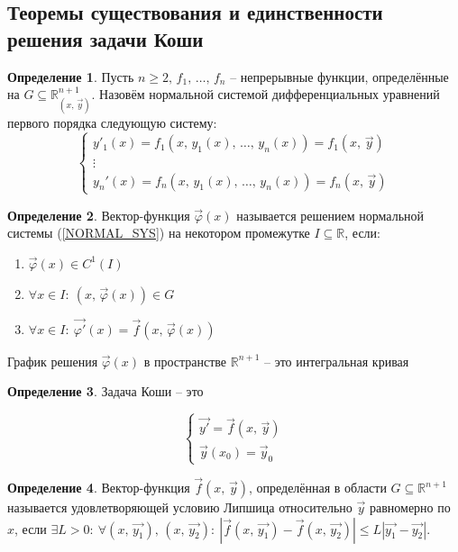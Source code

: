 \documentclass[a4paper,12pt]{article}
\renewcommand{\phi}{\ensuremath{\varphi}}
\renewcommand{\leq}{\ensuremath{\leqslant}}
\renewcommand{\geq}{\ensuremath{\geqslant}}
\theoremstyle{plain}
\theoremstyle{definition}
\newtheorem{definition}{Определение}[section]
\theoremstyle{remark}
\begin{document}
\subsection{Теоремы существования и единственности решения задачи Коши}
\begin{definition}
	Пусть $n \geq 2,\, f_1,\, \ldots,\, f_n$ -- непрерывные функции, определённые на $G \subseteq \mathbb{R}^{n + 1}_{(x,\, \vec{y})}$. Назовём нормальной системой дифференциальных уравнений первого порядка следующую систему:
	\begin{equation}
		\label{NORMAL_SYS}
		\begin{cases}
			y'_1(x) = f_1(x,\,y_1(x),\,\ldots,\,y_n(x)) = f_1(x,\,\vec{y}) \\
			\vdots                                                         \\
			y_n'(x) = f_n(x,\,y_1(x),\,\ldots,\,y_n(x)) = f_n(x,\,\vec{y})
		\end{cases}
	\end{equation}

\end{definition}

\begin{definition}
	Вектор-функция $\vec{\phi}(x)$ называется решением нормальной системы (\ref*{NORMAL_SYS}) на некотором промежутке $I \subseteq \mathbb{R}$, если:
	\begin{enumerate}
		\item $\vec{\phi}(x) \in C^1(I)$
		\item $\forall x \in I:\: (x,\,\vec{\phi}(x)) \in G$
		\item $\forall x \in I:\: \vec{\phi'}(x) = \vec{f}(x,\, \vec{\phi}(x))$
	\end{enumerate}

	График решения $\vec{\phi}(x)$ в пространстве $\mathbb{R}^{n + 1}$ -- это интегральная кривая
\end{definition}

\begin{definition}
	Задача Коши -- это

	\[\begin{cases}
			\vec{y'} = \vec{f}(x,\, \vec{y}) \\
			\vec{y}(x_0) = \vec{y}_0
		\end{cases}\]
\end{definition}

\begin{definition}
	Вектор-функция $\vec{f}(x,\,\vec{y})$, определённая в области $G \subseteq \mathbb{R}^{n + 1}$ называется удовлетворяющей условию Липшица относительно $\vec{y}$ равномерно по $x$, если $\exists L > 0:\: \forall (x,\, \vec{y_1}),\, (x,\,\vec{y_2}):\: |\vec{f}(x,\,\vec{y_1}) - \vec{f}(x,\,\vec{y_2})| \leq L|\vec{y_1} - \vec{y_2}|$.
\end{definition}
\end{document}
